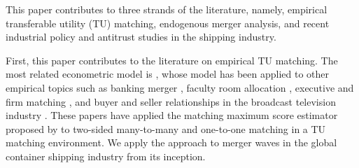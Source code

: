 \documentclass[10pt]{article}
\begin{document}
This paper contributes to three strands of the literature, namely, empirical transferable utility (TU) matching, endogenous merger analysis, and recent industrial policy and antitrust studies in the shipping industry.

First, this paper contributes to the literature on empirical TU matching. 
The most related econometric model is \cite{fox2018qe}, whose model has been applied to other empirical topics such as banking merger \citep{akkus2015ms,chen2013ijio}, faculty room allocation \citep{baccara2012aer}, executive and firm matching \citep{pan2017determinants}, and buyer and seller relationships in the broadcast television industry \citep{stahl2016aer}. 
These papers have applied the matching maximum score estimator proposed by \cite{fox2010qe,fox2018qe} to two-sided many-to-many and one-to-one matching in a TU matching environment. 
We apply the approach to merger waves in the global container shipping industry from its inception.
\end{document}
